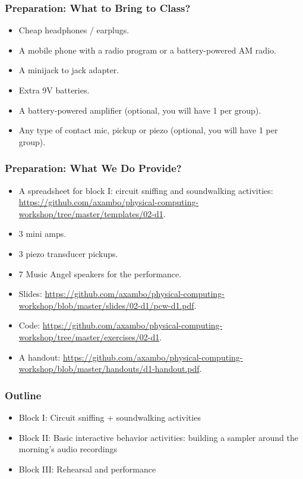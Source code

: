 \documentclass[screen, aspectratio=43]{beamer}
\begin{document}
\begin{frame}
  \frametitle{Preparation: What to Bring to Class?}
        \begin{itemize}
        \item Cheap headphones / earplugs.
        \item A mobile phone with a radio program or a battery-powered AM radio.
        \item A minijack to jack adapter.
        \item Extra 9V batteries.
        \item A battery-powered amplifier (optional, you will have 1 per group).
        \item Any type of contact mic, pickup or piezo (optional, you will have 1 per group).
         \end{itemize}
\end{frame}
%
\begin{frame}
  \frametitle{Preparation: What We Do Provide?}
        \begin{itemize}
        \item A spreadsheet for block I: circuit sniffing and soundwalking activities: \url{https://github.com/axambo/physical-computing-workshop/tree/master/templates/02-d1}.
        \item 3 mini amps.
        \item 3 piezo transducer pickups.
        \item 7 Music Angel speakers for the performance.
        \item Slides: \url{https://github.com/axambo/physical-computing-workshop/blob/master/slides/02-d1/pcw-d1.pdf}.
        \item Code: \url{https://github.com/axambo/physical-computing-workshop/tree/master/exercises/02-d1}.
        \item A handout: \url{https://github.com/axambo/physical-computing-workshop/blob/master/handouts/d1-handout.pdf}.        
         \end{itemize}
\end{frame}
%
\begin{frame}
  \frametitle{Outline}
      \begin{itemize}
	\item Block I: Circuit sniffing + soundwalking activities
	\item Block II: Basic interactive behavior activities: building a sampler around the morning's audio recordings
	\item Block III: Rehearsal and performance
    \end{itemize}  
\end{frame}
\end{document}
